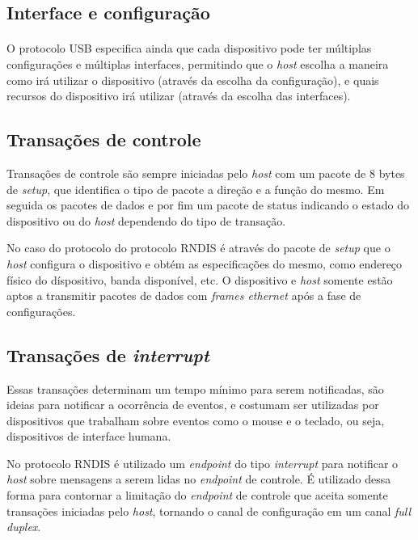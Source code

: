 \subsection{Interface e configuração}

\paragraph{}O protocolo USB especifica ainda que cada dispositivo pode ter múltiplas configurações e múltiplas interfaces, permitindo que o \textit{host} escolha a maneira como irá utilizar o dispositivo (através da escolha da configuração), e quais recursos do dispositivo irá utilizar (através da escolha das interfaces).

\subsection{Transações de controle}

Transações de controle são sempre iniciadas pelo \textit{host} com um pacote de 8 bytes de \textit{setup}, que identifica o tipo de pacote a direção e a função do mesmo. Em seguida os pacotes de dados e por fim um pacote de status indicando o estado do dispositivo ou do \textit{host} dependendo do tipo de transação.

No caso do protocolo do protocolo RNDIS é através do pacote de \textit{setup} que o \textit{host} configura o dispositivo e obtém as especificações do mesmo, como endereço físico do díspositivo, banda disponível, etc. O dispositivo e \textit{host} somente estão aptos a transmitir pacotes de dados com \textit{frames ethernet} após a fase de configurações. 

\subsection{Transações de \textit{interrupt}}

Essas transações determinam um tempo mínimo para serem notificadas, são ideias para notificar a ocorrência de eventos, e costumam ser utilizadas por dispositivos que trabalham sobre eventos como o mouse e o teclado, ou seja, dispositivos de interface humana.

No protocolo RNDIS é utilizado um \textit{endpoint} do tipo \textit{interrupt} para notificar o \textit{host} sobre mensagens a serem lidas no \textit{endpoint} de controle. É utilizado dessa forma para contornar a limitação do \textit{endpoint} de controle que aceita somente transações iniciadas pelo \textit{host}, tornando o canal de configuração em um canal \textit{full duplex}.

